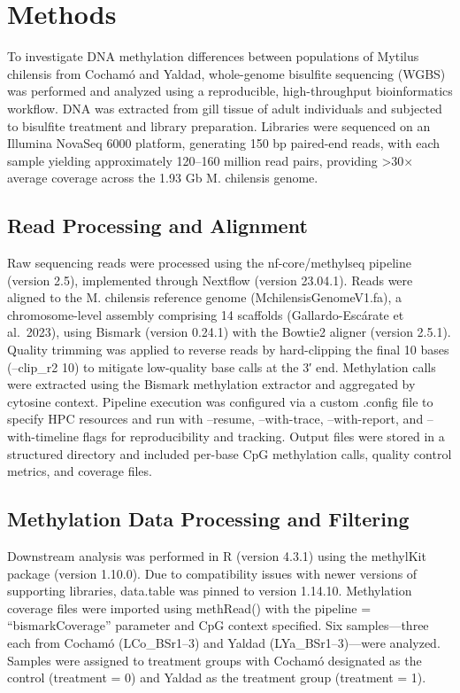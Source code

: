 \documentclass[
]{agujournal2019}
\begin{document}
\section{Methods}\label{methods}

To investigate DNA methylation differences between populations of
Mytilus chilensis from Cochamó and Yaldad, whole-genome bisulfite
sequencing (WGBS) was performed and analyzed using a reproducible,
high-throughput bioinformatics workflow. DNA was extracted from gill
tissue of adult individuals and subjected to bisulfite treatment and
library preparation. Libraries were sequenced on an Illumina NovaSeq
6000 platform, generating 150 bp paired-end reads, with each sample
yielding approximately 120--160 million read pairs, providing
\textgreater30× average coverage across the 1.93 Gb M. chilensis genome.

\subsection{Read Processing and
Alignment}\label{read-processing-and-alignment}

Raw sequencing reads were processed using the nf-core/methylseq pipeline
(version 2.5), implemented through Nextflow (version 23.04.1). Reads
were aligned to the M. chilensis reference genome
(MchilensisGenomeV1.fa), a chromosome-level assembly comprising 14
scaffolds (Gallardo-Escárate et al.~2023), using Bismark (version
0.24.1) with the Bowtie2 aligner (version 2.5.1). Quality trimming was
applied to reverse reads by hard-clipping the final 10 bases (--clip\_r2
10) to mitigate low-quality base calls at the 3′ end. Methylation calls
were extracted using the Bismark methylation extractor and aggregated by
cytosine context. Pipeline execution was configured via a custom .config
file to specify HPC resources and run with --resume, --with-trace,
--with-report, and --with-timeline flags for reproducibility and
tracking. Output files were stored in a structured directory and
included per-base CpG methylation calls, quality control metrics, and
coverage files.

\subsection{Methylation Data Processing and
Filtering}\label{methylation-data-processing-and-filtering}

Downstream analysis was performed in R (version 4.3.1) using the
methylKit package (version 1.10.0). Due to compatibility issues with
newer versions of supporting libraries, data.table was pinned to version
1.14.10. Methylation coverage files were imported using methRead() with
the pipeline = ``bismarkCoverage'' parameter and CpG context specified.
Six samples---three each from Cochamó (LCo\_BSr1--3) and Yaldad
(LYa\_BSr1--3)---were analyzed. Samples were assigned to treatment
groups with Cochamó designated as the control (treatment = 0) and Yaldad
as the treatment group (treatment = 1).
\end{document}
